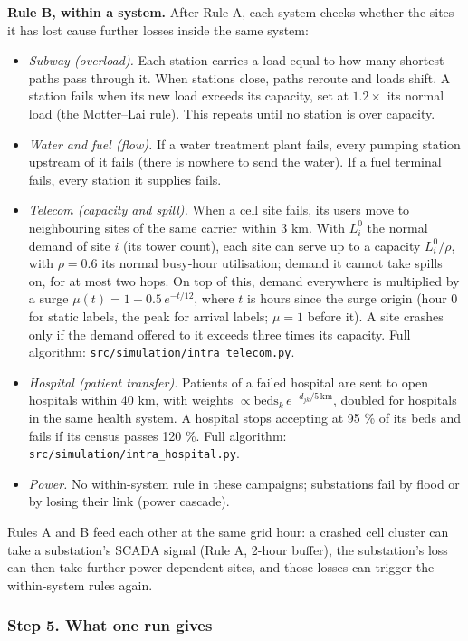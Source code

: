 \documentclass[11pt]{article}
\begin{document}
\textbf{Rule B, within a system.} After Rule A, each system checks whether the sites it has lost cause further losses inside the same system:
\begin{itemize}
\item \emph{Subway (overload).} Each station carries a load equal to how many shortest paths pass through it. When stations close, paths reroute and loads shift. A station fails when its new load exceeds its capacity, set at $1.2\times$ its normal load (the Motter--Lai rule). This repeats until no station is over capacity.
\item \emph{Water and fuel (flow).} If a water treatment plant fails, every pumping station upstream of it fails (there is nowhere to send the water). If a fuel terminal fails, every station it supplies fails.
\item \emph{Telecom (capacity and spill).} When a cell site fails, its users move to neighbouring sites of the same carrier within 3 km. With $L^0_i$ the normal demand of site $i$ (its tower count), each site can serve up to a capacity $L^0_i/\rho$, with $\rho=0.6$ its normal busy-hour utilisation; demand it cannot take spills on, for at most two hops. On top of this, demand everywhere is multiplied by a surge $\mu(t)=1+0.5\,e^{-t/12}$, where $t$ is hours since the surge origin (hour 0 for static labels, the peak for arrival labels; $\mu=1$ before it). A site crashes only if the demand offered to it exceeds three times its capacity. Full algorithm: \texttt{src/simulation/intra\_telecom.py}.
\item \emph{Hospital (patient transfer).} Patients of a failed hospital are sent to open hospitals within 40 km, with weights $\propto \text{beds}_k\,e^{-d_{jk}/5\,\text{km}}$, doubled for hospitals in the same health system. A hospital stops accepting at 95 \% of its beds and fails if its census passes 120 \%. Full algorithm: \texttt{src/simulation/intra\_hospital.py}.
\item \emph{Power.} No within-system rule in these campaigns; substations fail by flood or by losing their link (power cascade).
\end{itemize}

Rules A and B feed each other at the same grid hour: a crashed cell cluster can take a substation's SCADA signal (Rule A, 2-hour buffer), the substation's loss can then take further power-dependent sites, and those losses can trigger the within-system rules again.

\subsubsection*{Step 5. What one run gives}
\end{document}
